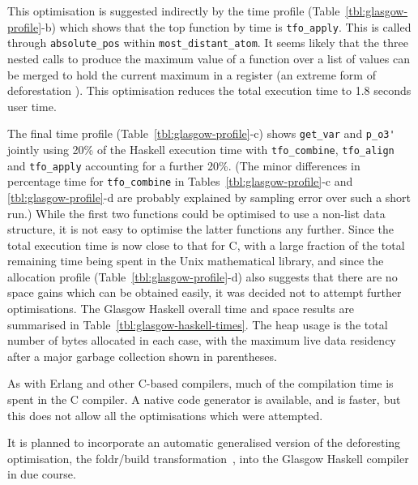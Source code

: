 This optimisation is suggested indirectly by the time profile
(Table~\ref{tbl:glasgow-profile}-b) which shows that the top function
by time is \verb=tfo_apply=. This is called through \verb=absolute_pos=
within \verb=most_distant_atom=. It seems likely that the three nested
calls to produce the maximum value of a function over a list of values
can be merged to hold the current maximum in a register (an extreme
form of deforestation \cite{Wad90b}). This optimisation reduces the
total execution time to 1.8 seconds user time.

The final time profile (Table~\ref{tbl:glasgow-profile}-c) shows
\verb=get_var= and \verb=p_o3'= jointly using 20\% of the Haskell
execution time with \verb=tfo_combine=, \verb=tfo_align= and
\verb=tfo_apply= accounting for a further 20\%. (The minor differences
in percentage time for \verb=tfo_combine= in
Tables~\ref{tbl:glasgow-profile}-c and \ref{tbl:glasgow-profile}-d are
probably explained by sampling error over such a short run.) While the
first two functions could be optimised to use a non-list data
structure, it is not easy to optimise the latter functions any further.
Since the total execution time is now close to that for C, with a large
fraction of the total remaining time being spent in the Unix
mathematical library, and since the allocation profile
(Table~\ref{tbl:glasgow-profile}-d) also suggests that there are no
space gains which can be obtained easily, it was decided not to attempt
further optimisations. The Glasgow Haskell overall time and space results are
summarised in Table~\ref{tbl:glasgow-haskell-times}. The heap usage is
the total number of bytes allocated in each case, with the maximum live
data residency after a major garbage collection shown in parentheses.

As with Erlang and other C-based compilers, much of the compilation
time is spent in the C compiler.  A native code generator is
available, and is faster, but this does not allow all the
optimisations which were attempted.

It is planned to incorporate an automatic generalised version of the
deforesting optimisation, the foldr/build transformation~\cite{Gil94},
into the Glasgow Haskell compiler in due course.

